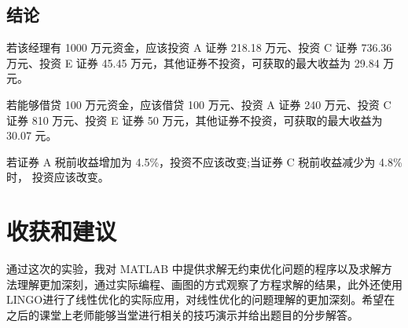 \documentclass{article}
\begin{document}
\subsection{结论}

若该经理有 1000 万元资金，应该投资 A 证券 218.18 万元、投资 C 证券 736.36 万元、投资 E 证券 45.45 万元，其他证券不投资，可获取的最大收益为 29.84 万元。


若能够借贷 100 万元资金，应该借贷 100 万元、投资 A 证券 240 万元、投资 C 证券 810 万元、投资 E 证券 50 万元，其他证券不投资，可获取的最大收益为 30.07 元。


若证券 A 税前收益增加为 4.5\%，投资不应该改变;当证券 C 税前收益减少为 4.8\% 时， 投资应该改变。

\section{收获和建议}


通过这次的实验，我对 MATLAB 中提供求解无约束优化问题的程序以及求解方法理解更加深刻，通过实际编程、画图的方式观察了方程求解的结果，此外还使用LINGO进行了线性优化的实际应用，对线性优化的问题理解的更加深刻。希望在之后的课堂上老师能够当堂进行相关的技巧演示并给出题目的分步解答。
\end{document}
